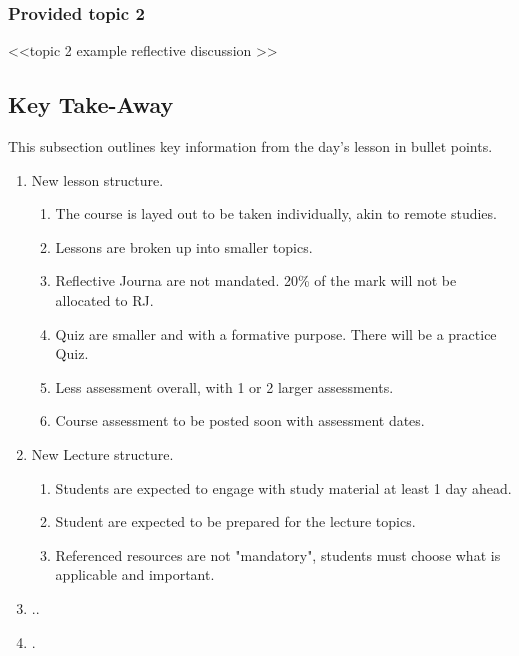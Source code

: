 \subsubsection{Provided topic 2}

<<topic 2 example reflective discussion >>






\subsection{Key Take-Away}

This subsection outlines key information from the day's lesson in bullet points.

\begin{enumerate}
    \item New lesson structure.
    \begin{enumerate}
        \item The course is layed out to be taken individually, akin to remote studies.
        \item Lessons are broken up into smaller topics.
        \item Reflective Journa are not mandated. 20\% of the mark will not be allocated to RJ.
        \item Quiz are smaller and with a formative purpose. There will be a practice Quiz.
        \item Less assessment overall, with 1 or 2 larger assessments.
        \item Course assessment to be posted soon with assessment dates.
    \end{enumerate}
    \item New Lecture structure.
    \begin{enumerate}
        \item Students are expected to engage with study material at least 1 day ahead.
        \item Student are expected to be prepared for the lecture topics.
        \item Referenced resources are not "mandatory", students must choose what is applicable and important.
    \end{enumerate}
    \item ..
    \item .
\end{enumerate}



